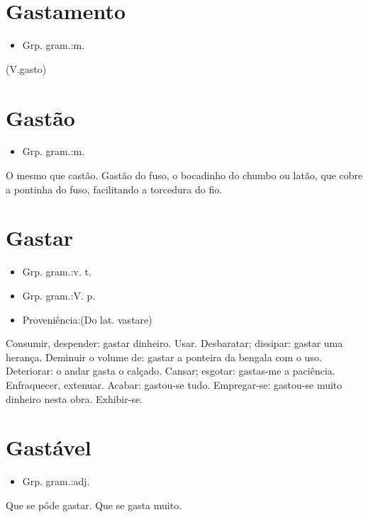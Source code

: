 \section{Gastamento}
\begin{itemize}
\item {Grp. gram.:m.}
\end{itemize}
(V.gasto)
\section{Gastão}
\begin{itemize}
\item {Grp. gram.:m.}
\end{itemize}
O mesmo que \textunderscore castão\textunderscore .
\textunderscore Gastão do fuso\textunderscore , o bocadinho do chumbo ou latão, que cobre a pontinha do fuso, facilitando a torcedura do fio.
\section{Gastar}
\begin{itemize}
\item {Grp. gram.:v. t.}
\end{itemize}
\begin{itemize}
\item {Grp. gram.:V. p.}
\end{itemize}
\begin{itemize}
\item {Proveniência:(Do lat. \textunderscore vastare\textunderscore )}
\end{itemize}
Consumir, despender: \textunderscore gastar dinheiro\textunderscore .
Usar.
Desbaratar; dissipar: \textunderscore gastar uma herança\textunderscore .
Deminuir o volume de: \textunderscore gastar a ponteira da bengala com o uso\textunderscore .
Deteriorar: \textunderscore o andar gasta o calçado\textunderscore .
Cansar; esgotar: \textunderscore gastas-me a paciência\textunderscore .
Enfraquecer, extenuar.
Acabar: \textunderscore gastou-se tudo\textunderscore .
Empregar-se: \textunderscore gastou-se muito dinheiro nesta obra\textunderscore .
Exhibir-se.
\section{Gastável}
\begin{itemize}
\item {Grp. gram.:adj.}
\end{itemize}
Que se póde gastar.
Que se gasta muito.
